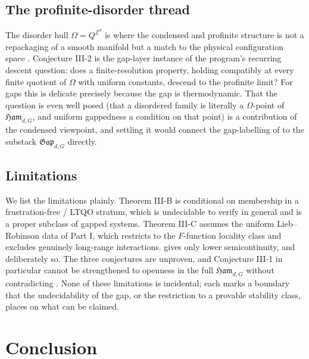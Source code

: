 \documentclass[12pt]{article}
\newcommand{\Ffun}{F}                          %
\newcommand{\Ham}{\mathfrak{Ham}}              %
\newcommand{\Gap}{\mathfrak{Gap}}              %
\newcommand{\dis}{\Omega}                       %
\newcommand{\Z}{\mathbb{Z}}
\theoremstyle{plain}
\theoremstyle{definition}
\theoremstyle{remark}
\begin{document}
\subsection{The profinite-disorder thread}
\label{sec:disc-disorder}

The disorder hull $\dis=Q^{\Z^d}$ is where the condensed and profinite structure is
not a repackaging of a smooth manifold but a match to the physical configuration space
\cite{bellissard-ncg-qhe,kellendonk-tilings,prodan-sb}. Conjecture III-2 is the
gap-layer instance of the program's recurring descent question: does a
finite-resolution property, holding compatibly at every finite quotient of $\dis$ with
uniform constants, descend to the profinite limit? For gaps this is delicate precisely
because the gap is thermodynamic. That the question is even well posed (that a
disordered family is literally a $\dis$-point of $\Ham_{d,G}$, and uniform gappedness a
condition on that point) is a contribution of the condensed viewpoint, and settling it
would connect the gap-labelling of \cite{bellissard-ncg-qhe} to the substack
$\Gap_{d,G}$ directly.

\subsection{Limitations}
\label{sec:disc-limits}

We list the limitations plainly. Theorem III-B is conditional on membership in a
frustration-free / LTQO stratum, which is undecidable to verify in general and is a
proper subclass of gapped systems. Theorem III-C assumes the uniform Lieb--Robinson
data of Part I, which restricts to the $\Ffun$-function locality class and excludes
genuinely long-range interactions.  gives only lower semicontinuity, and
deliberately so. The three conjectures are unproven, and Conjecture III-1 in particular
cannot be strengthened to openness in the full $\Ham_{d,G}$ without contradicting
\cite{cpw-undecidable}. None of these limitations is incidental; each marks a boundary
that the undecidability of the gap, or the restriction to a provable stability class,
places on what can be claimed.

\section{Conclusion}
\label{sec:conclusion}
\end{document}

